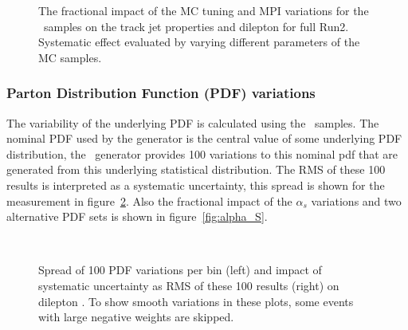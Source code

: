 \begin{figure}[h!]
  \caption{The fractional impact of the MC tuning and MPI variations for the \pythia~samples on the track jet properties and dilepton \pt for full Run2. Systematic effect evaluated by varying different parameters of the MC samples.}
  \label{fig:PS_MPI}
\end{figure}

\subsubsection{Parton Distribution Function (PDF) variations}
The variability of the underlying PDF is calculated using the \sherpa~samples. The nominal PDF used by the generator is the central value of some underlying PDF distribution, the \sherpa~generator provides 100 variations to this nominal pdf that are generated from this underlying statistical distribution.  The RMS of these 100 results is interpreted as a systematic uncertainty, this spread is shown for the measurement in figure~\ref{fig:PDF_RMS}. Also the fractional impact of the $\alpha_{s}$ variations and two alternative PDF sets is shown in figure~\ref{fig:alpha_S}.
\begin{figure}[h!]
  \centering
   \\
  \caption{Spread of 100 PDF variations per bin (left) and impact of systematic uncertainty as RMS of these 100 results (right) on dilepton \pt. To show smooth variations in these plots, some events with large negative weights are skipped.}
  \label{fig:PDF_RMS}
\end{figure}

